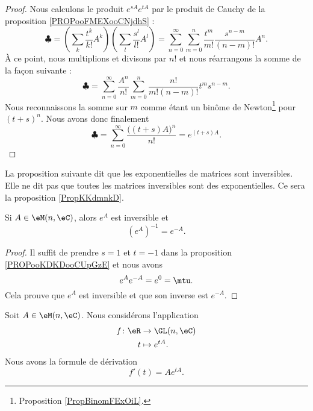 \begin{proof}
    Nous calculons le produit \( e^{sA} e^{tA}\) par le produit de Cauchy de la proposition \ref{PROPooFMEXooCNjdhS} :
    \begin{equation}
        \clubsuit = \left( \sum_k\frac{ t^k }{ k! }A^k \right)\left( \sum_l\frac{ s^l }{ l! }A^l \right)=\sum_{n=0}^{\infty}\sum_{m=0}^n\frac{ t^m }{ m! }\frac{ s^{n-m} }{ (n-m)! }A^n.
    \end{equation}
    À ce point, nous multiplions et divisons par \( n!\) et nous réarrangons la somme de la façon suivante :
    \begin{equation}
        \clubsuit = \sum_{n=0}^{\infty}\frac{ A^n }{ n! }\sum_{m=0}^n\frac{ n! }{ m!(n-m)! }t^ms^{n-m}.
    \end{equation}
    Nous reconnaissons la somme sur \( m\) comme étant un binôme de Newton\footnote{Proposition \ref{PropBinomFExOiL}.} pour \( (t+s)^n\). Nous avons donc finalement
    \begin{equation}
        \clubsuit = \sum_{n=0}^{\infty}\frac{ \big( (t+s)A \big)^n }{ n! }= e^{(t+s)A}.
    \end{equation}
\end{proof}

La proposition suivante dit que les exponentielles de matrices sont inversibles. Elle ne dit pas que toutes les matrices inversibles sont des exponentielles. Ce sera la proposition \ref{PropKKdmnkD}.
\begin{proposition}       \label{PROPooRERRooMutKcg}
    Si \( A\in \eM(n,\eC)\), alors \(  e^{A}\) est inversible et 
    \begin{equation}
        ( e^{A})^{-1}= e^{-A}.
    \end{equation}
\end{proposition}

\begin{proof}
    Il suffit de prendre \( s=1\) et \( t=-1\) dans la proposition \ref{PROPooKDKDooCUpGzE} et nous avons
    \begin{equation}
        e^{A} e^{-A}= e^{0}=\mtu.
    \end{equation}
    Cela prouve que \(  e^{A}\) est inversible et que son inverse est \(  e^{-A}\).
\end{proof}

\begin{proposition}       \label{PROPooSDNNooQtHkhA}
    Soit \( A\in \eM(n,\eC)\). Nous considérons l'application
    \begin{equation}
        \begin{aligned}
            f\colon \eR&\to \GL(n,\eC) \\
            t&\mapsto  e^{tA}. 
        \end{aligned}
    \end{equation}
    Nous avons la formule de dérivation
    \begin{equation}
        f'(t)=A e^{tA}.
    \end{equation}
\end{proposition}

